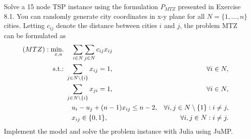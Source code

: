 Solve a 15 node TSP instance using the formulation $P_{MTZ}$ presented in Exercise 8.1. You can randomly generate city coordinates in x-y plane for all $N = \{1,\dots,n\}$ cities. Letting $c_{ij}$ denote the distance between cities $i$ and $j$, the problem MTZ can be formulated as
%
\begin{align*}
	(MTZ) : \mathop{\text{min.~}}_{x,u} & ~~\,\sum_{i\in N}\sum_{j\in N} c_{ij}x_{ij}\\
		    \mathop{\text{s.t.:~}} & \sum_{j \in N \setminus \{i\}} x_{ij} = 1, & \forall i \in N, \\
		        & \sum_{j \in N \setminus \{i\}} x_{ji} = 1, & \forall i \in N, \\   
		        & ~~\,u_{i} - u_{j} + (n-1) x_{ij} \leq n - 2, & \forall i,j \in N \setminus \{ 1 \} : i \neq j,\\
		        & ~~\,x_{ij} \in \{0,1\}, & \forall i,j \in N : i\neq j.
\end{align*}
%
Implement the model and solve the problem instance with Julia using JuMP.